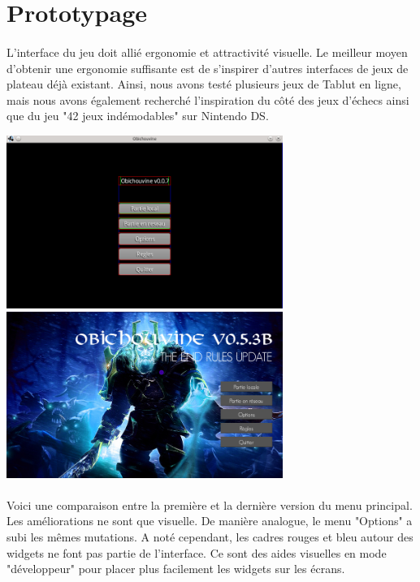 \documentclass[11pt]{article} %
\begin{document}
\section{Prototypage}
\paragraph{}
L'interface du jeu doit allié ergonomie et attractivité visuelle. Le meilleur moyen d'obtenir une ergonomie suffisante est de s'inspirer d'autres interfaces de jeux de plateau déjà existant. Ainsi, nous avons testé plusieurs jeux de Tablut en ligne, mais nous avons également recherché l'inspiration du côté des jeux d’échecs ainsi que du jeu "42 jeux indémodables" sur Nintendo DS.

\begin{center}
\includegraphics[width=9cm]{snapshot1.png}
\includegraphics[width=9cm]{validDoc1.jpg}
\end{center}

\paragraph{}
Voici une comparaison entre la première et la dernière version du menu principal. Les améliorations ne sont que visuelle. De manière analogue, le menu "Options" a subi les mêmes mutations. A noté cependant, les cadres rouges et bleu autour des widgets ne font pas partie de l'interface. Ce sont des aides visuelles en mode "développeur" pour placer plus facilement les widgets sur les écrans. 
\end{document}
